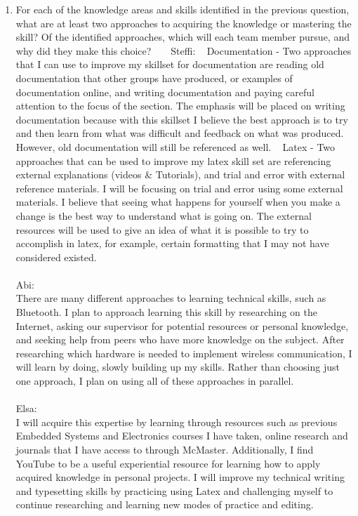 \documentclass[12pt]{article}
\begin{document}
\begin{enumerate}
  \item For each of the knowledge areas and skills identified in the previous
  question, what are at least two approaches to acquiring the knowledge or
  mastering the skill?  Of the identified approaches, which will each team
  member pursue, and why did they make this choice?
    ~\newline
    ~\newline
Steffi: 
  ~\newline
 Documentation - Two approaches that I can use to improve my skillset for documentation are reading old documentation that other groups have produced, or examples of documentation online, and writing documentation and paying careful attention to the focus of the section.  The emphasis will be placed on writing documentation because with this skillset I believe the best approach is to try and then learn from what was difficult and feedback on what was produced.  However, old documentation will still be referenced as well. 
  ~\newline
  Latex - Two approaches that can be used to improve my latex skill set are referencing external explanations (videos \& Tutorials), and trial and error with external reference materials.  I will be focusing on trial and error using some external materials.  I believe that seeing what happens for yourself when you make a change is the best way to understand what is going on.  The external resources will be used to give an idea of what it is possible to try to accomplish in latex, for example, certain formatting that I may not have considered existed. 
\\
\\
Abi:
\\ There are many different approaches to learning technical skills, such as Bluetooth.  I plan to approach learning this skill by researching on the Internet, asking our supervisor for potential resources or personal knowledge, and seeking help from peers who have more knowledge on the subject.  After researching which hardware is needed to implement wireless communication, I will learn by doing, slowly building up my skills. Rather than choosing just one approach, I plan on using all of these approaches in parallel. 
\\
\\
Elsa:
\\ 
  I will acquire this expertise by learning through resources such as previous Embedded Systems and Electronics courses I have taken, online research and journals that I have access to through McMaster. Additionally, I find YouTube to be a useful experiential resource for learning how to apply acquired knowledge in personal projects. I will improve my technical writing and typesetting skills by practicing using Latex and challenging myself to continue researching and learning new modes of practice and editing.

\end{enumerate}
\end{document}
